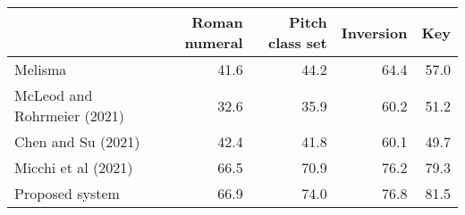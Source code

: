 \begin{tabular}{l|rrrr}
                            & Roman numeral & Pitch class set & Inversion & Key  \\
\hline
Melisma                     & 41.6          & 44.2            & 64.4      & 57.0 \\
McLeod and Rohrmeier (2021) & 32.6          & 35.9            & 60.2      & 51.2 \\
Chen and Su (2021)          & 42.4          & 41.8            & 60.1      & 49.7 \\
Micchi et al (2021)         & 66.5          & 70.9            & 76.2      & 79.3 \\
Proposed system             & 66.9          & 74.0            & 76.8      & 81.5
\end{tabular}
